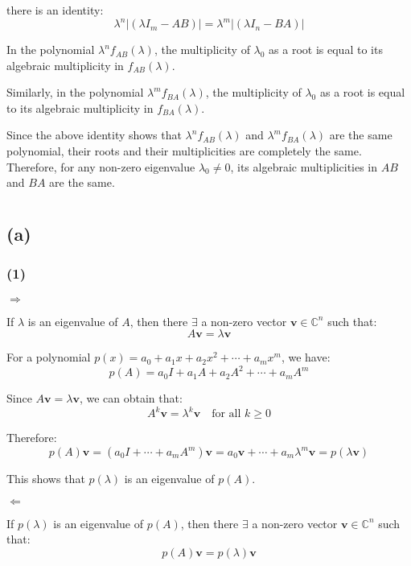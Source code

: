 \documentclass{article}
\begin{document}
there is an identity:
$$
\lambda^n \vert(\lambda I_m - AB)\vert = \lambda^m \vert(\lambda I_n - BA)\vert
$$

In the polynomial $ \lambda^n f_{AB}(\lambda) $, the multiplicity of $ \lambda_0 $ as a root is equal to its algebraic multiplicity in $ f_{AB}(\lambda) $. 

Similarly, in the polynomial $ \lambda^m f_{BA}(\lambda) $, the multiplicity of $ \lambda_0 $ as a root is equal to its algebraic multiplicity in $ f_{BA}(\lambda) $.

Since the above identity shows that $ \lambda^n f_{AB}(\lambda) $ and $ \lambda^m f_{BA}(\lambda) $ are the same polynomial, their roots and their multiplicities are completely the same. Therefore, for any non-zero eigenvalue $ \lambda_0 \neq 0 $, its algebraic multiplicities in $ AB $ and $ BA $ are the same.

\section{}

\subsection*{(a)} 

\subsubsection*{(1)} 

$\Rightarrow$

If $ \lambda $ is an eigenvalue of $ A $, then there $\exists$ a non-zero vector $ \mathbf{v}\in\mathbb{C}^n $ such that:
$$
A\mathbf{v}=\lambda\mathbf{v}
$$

For a polynomial $ p(x)=a_0 + a_1x + a_2x^2+\cdots + a_mx^m $, we have:
$$
p(A)=a_0I + a_1A + a_2A^2+\cdots + a_mA^m
$$

Since $ A\mathbf{v}=\lambda\mathbf{v} $, we can obtain that:
$$
A^k\mathbf{v}=\lambda^k\mathbf{v}\quad\text{for all }k\geq0
$$

Therefore:
$$
p(A)\mathbf{v}=(a_0I +\cdots + a_mA^m)\mathbf{v}=a_0\mathbf{v}+\cdots + a_m\lambda^m\mathbf{v}=p(\lambda \mathbf{v})
$$

This shows that $ p(\lambda) $ is an eigenvalue of $ p(A) $.

$\Leftarrow$

If $ p(\lambda) $ is an eigenvalue of $ p(A) $, then there $\exists$ a non-zero vector $ \mathbf{v}\in\mathbb{C}^n $ such that:
$$
p(A)\mathbf{v}=p(\lambda)\mathbf{v}
$$
\end{document}
